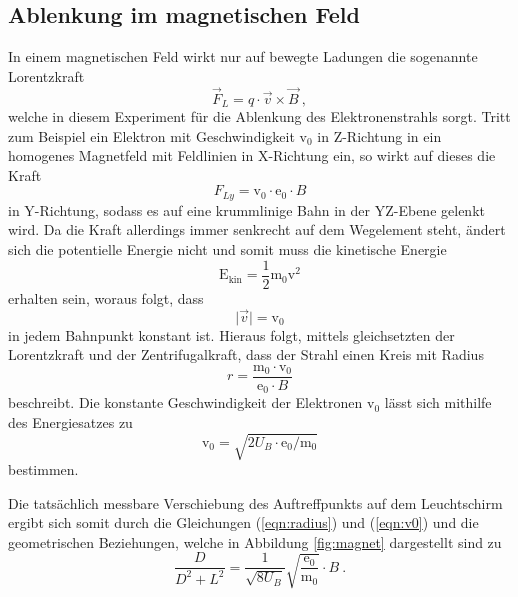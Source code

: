 \subsection{Ablenkung im magnetischen Feld}
In einem magnetischen Feld wirkt nur auf bewegte Ladungen die sogenannte
Lorentzkraft
\begin{equation}
  \vec{F}_L = q \cdot \vec{v} \times \vec{B} \: ,
  \label{eqn:lorentz}
\end{equation}
welche in diesem Experiment für die Ablenkung des Elektronenstrahls sorgt.
Tritt zum Beispiel ein Elektron mit Geschwindigkeit $\text{v}_0$ in Z-Richtung in ein homogenes
Magnetfeld mit Feldlinien in X-Richtung ein, so wirkt auf dieses die Kraft
\begin{equation}
  F_{Ly} = \text{v}_0 \cdot \text{e}_0 \cdot B
\end{equation}
in Y-Richtung, sodass es auf eine krummlinige Bahn in der YZ-Ebene gelenkt wird.
Da die Kraft allerdings immer senkrecht auf dem Wegelement steht, ändert sich die
potentielle Energie nicht und somit muss die kinetische Energie
\begin{equation}
  \text{E}_{\text{kin}} = \frac{1}{2} \text{m}_0 \text{v}^2
  \label{eqn:ekin}
\end{equation}
erhalten sein, woraus folgt, dass
\begin{equation}
  \lvert\vec{v}\rvert = \text{v}_0
\end{equation}
in jedem Bahnpunkt konstant ist.
Hieraus folgt, mittels gleichsetzten der Lorentzkraft und der
Zentrifugalkraft, dass der Strahl einen Kreis mit Radius
\begin{equation}
  r = \frac{\text{m}_0 \cdot \text{v}_0}{\text{e}_0\cdot B}
  \label{eqn:radius}
\end{equation}
beschreibt.
Die konstante Geschwindigkeit der Elektronen $\text{v}_0$ lässt sich mithilfe
des Energiesatzes zu
\begin{equation}
  \text{v}_0 = \sqrt{2 U_B \cdot \text{e}_0 / \text{m}_0}
  \label{eqn:v0}
\end{equation}
bestimmen.

Die tatsächlich messbare Verschiebung des Auftreffpunkts auf dem Leuchtschirm
ergibt sich somit durch die Gleichungen (\ref{eqn:radius}) und (\ref{eqn:v0}) und die
geometrischen Beziehungen, welche in Abbildung \ref{fig:magnet} dargestellt sind zu
\begin{equation}
   \frac{D}{D^2 + L^2} = \frac{1}{\sqrt{8 U_B}}\sqrt{\frac{\text{e}_0}{\text{m}_0}}\cdot B \: .
   \label{eqn:magnet}
\end{equation}

